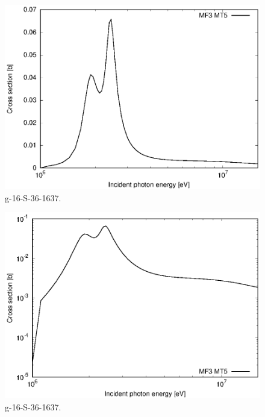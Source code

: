 \begin{figure}
 \includegraphics[width=\linewidth]{eps/g_16-S-36_1637.eps}
  \caption{g-16-S-36-1637.}
\end{figure}
\begin{figure}
 \includegraphics[width=\linewidth]{eps-log/g_16-S-36_1637.eps}
 \caption{g-16-S-36-1637.}
\end{figure}
\newpage \clearpage

